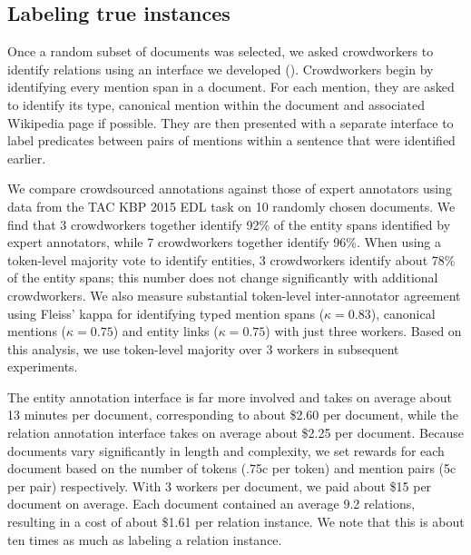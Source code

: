 \subsection{Labeling true instances}
Once a random subset of documents was selected, we asked crowdworkers to identify relations using an interface we developed ().
Crowdworkers begin by identifying every mention span in a document.
  For each mention, they are asked to identify its type, canonical mention within the document
  and associated Wikipedia page if possible.
They are then presented with a separate interface to label predicates between pairs of mentions within a sentence that were identified earlier.

We compare crowdsourced annotations against those of expert annotators using data from the TAC KBP 2015 EDL task on 10 randomly chosen documents.
We find that 3 crowdworkers together identify 92\% of the entity spans identified by expert annotators, while 7 crowdworkers together identify 96\%.
When using a token-level majority vote to identify entities, 3 crowdworkers identify about 78\% of the entity spans; this number does not change significantly with additional crowdworkers.
We also measure substantial token-level inter-annotator agreement using Fleiss' kappa for identifying typed mention spans ($\kappa = 0.83$), canonical mentions ($\kappa = 0.75$) and entity links ($\kappa = 0.75$) with just three workers.
Based on this analysis, we use token-level majority over 3 workers in subsequent experiments.

The entity annotation interface is far more involved and takes on average about 13 minutes per document, corresponding to about \$2.60 per document, while the relation annotation interface takes on average about \$2.25 per document.
Because documents vary significantly in length and complexity, we set rewards for each document based on the number of tokens (.75c per token) and mention pairs (5c per pair) respectively.
With 3 workers per document, we paid about \$15 per document on average.
Each document contained an average 9.2 relations, resulting in a cost of about \$1.61 per relation instance.
We note that this is about ten times as much as labeling a relation instance.

